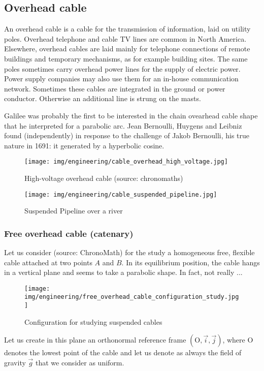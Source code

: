 	\pagebreak
	\subsection{Overhead cable}
	An overhead cable is a cable for the transmission of information, laid on utility poles. Overhead telephone and cable TV lines are common in North America. Elsewhere, overhead cables are laid mainly for telephone connections of remote buildings and temporary mechanisms, as for example building sites. The same poles sometimes carry overhead power lines for the supply of electric power. Power supply companies may also use them for an in-house communication network. Sometimes these cables are integrated in the ground or power conductor. Otherwise an additional line is strung on the masts.
	
	Galilee was probably the first to be interested in the chain ovearhead cable shape that he interpreted for a parabolic arc. Jean Bernoulli, Huygens and Leibniz found (independently) in response to the challenge of Jakob Bernoulli, his true nature in 1691: it generated by a hyperbolic cosine.
	\begin{figure}[H]
		\centering
		\texttt{[image: img/engineering/cable\_overhead\_high\_voltage.jpg]}
		\caption[]{High-voltage overhead cable (source: chronomaths)}
	\end{figure}
	\begin{figure}[H]
		\centering
		\texttt{[image: img/engineering/cable\_suspended\_pipeline.jpg]}
		\caption[]{Suspended Pipeline over a river}
	\end{figure}
	
	
	\pagebreak
	\subsubsection{Free overhead cable (catenary)}
	Let us consider (source: ChronoMath) for the study a homogeneous free, flexible cable attached at two points $A$ and $B$. In its equilibrium position, the cable hangs in a vertical plane and seems to take a parabolic shape. In fact, not really ...
	\begin{figure}[H]
		\centering
		\texttt{[image: img/engineering/free\_overhead\_cable\_configuration\_study.jpg]}
		\caption{Configuration for studying suspended cables}
	\end{figure}
	Let us create in this plane an orthonormal reference frame $(\text{O},\vec{i},\vec{j})$, where O denotes the lowest point of the cable and let us denote as always the field of gravity $\vec{g}$ that we consider as uniform.

